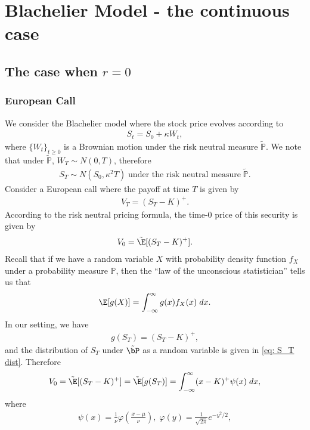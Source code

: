 
\section{Blachelier Model - the continuous case}
\subsection{The case when $r = 0$}
\subsubsection{European Call}
We consider the Blachelier model where the stock price evolves according to 
\begin{align}
	 S_t = S_0 + \kappa W_t,
\end{align}
where $\{W_t\}_{t \ge 0}$ is a Brownian motion under the risk neutral measure $\tilde{\mathbb{P}}$. We note that under $\tilde{\mathbb{P}}$, $ W_T \sim N(0, T)$, therefore
\begin{align}\label{eq: S_T dist}
S_T \sim N(S_0, \kappa^2T) \; \text{under the risk neutral measure} \; \tilde{\mathbb{P}}.
\end{align}
Consider a European call where the payoff at time $T$ is given by 
\begin{align}
	 V_T = (S_T - K)^+.
\end{align}
According to the risk neutral pricing formula, the time-0 price of this security is given by 
\begin{align}
	 V_0 = \tilde{\E}[(S_T - K)^+].
\end{align}
Recall that if we have a random variable $X$ with probability density function $f_X$ under a probability measure $\mathbb{P}$, then the ``law of the unconscious statistician'' tells us that 
\begin{align}
	 \E[g(X)] = \int_{-\infty}^\infty g(x) f_X(x) \; dx.
\end{align}
In our setting, we have 
\begin{align}
	 g(S_T) = (S_T - K)^+,
\end{align}
and the distribution of $S_T$ under $\tilde{\bP}$ as a random variable is given in \eqref{eq: S_T dist}. Therefore 
\begin{align}\label{eq: call int}
	 V_0 = \tilde{\E}[(S_T - K)^+] =  \tilde{\E}[g(S_T)] = \int_{-\infty}^\infty (x-K)^+ \psi(x) \; dx,
\end{align}
where 
\begin{align}
	 \psi(x) = \frac{1}{\nu}\varphi\left(\frac{x-\mu}{\nu}\right), \; \varphi(y) = \frac{1}{\sqrt{2\pi}}e^{-y^2/2}, 
\end{align}
